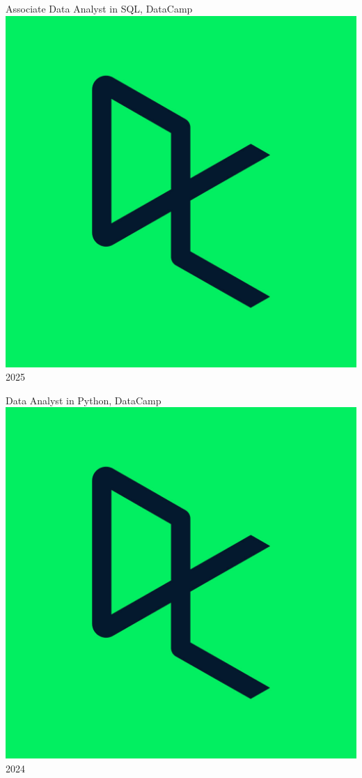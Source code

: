 Associate Data Analyst in SQL, DataCamp \hspace{0.1 cm} \href{https://www.datacamp.com/statement-of-accomplishment/track/02d44d34b324022d8b3eea58c930f0c42dc2e079?raw=1}{\includegraphics[scale=0.008]{datacamp.jpg}} \hfill 2025

Data Analyst in Python,  DataCamp \hspace{0.1 cm} \href{https://www.datacamp.com/statement-of-accomplishment/track/ae5ff9b46e9570e8c32451cbb5a1e6b5488c22ad?raw=1}{\includegraphics[scale=0.008]{datacamp.jpg}}\hfill 2024

